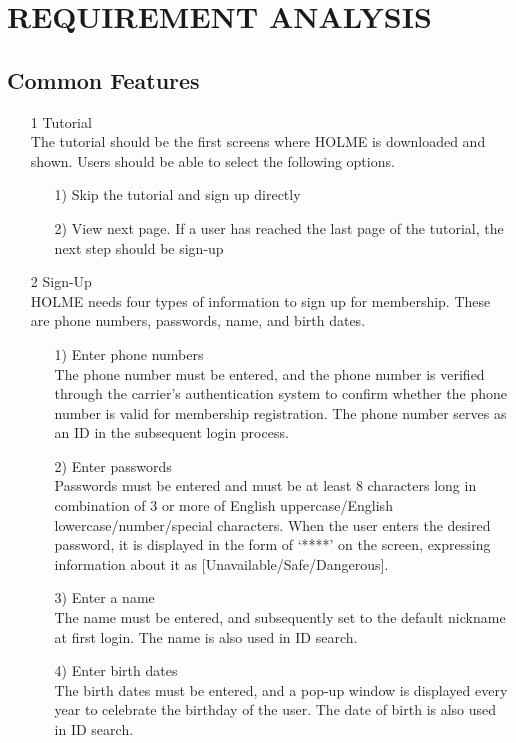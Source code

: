 \documentclass[conference]{IEEEtran}
\begin{document}
\section{REQUIREMENT ANALYSIS}

\subsection{Common Features}
\begin{enumerate}


\item[1] Tutorial \\ 
The tutorial should be the first screens where HOLME is downloaded and shown. Users should be able to select the following options. 
\begin{itemize}
\item [1)] Skip the tutorial and sign up directly
\item [2)] View next page. If a user has reached the last page of the tutorial, the next step should be sign-up\\
\end{itemize}


\item[2] Sign-Up \\ 
HOLME needs four types of information to sign up for membership. These are phone numbers, passwords, name, and birth dates.
\begin{itemize}
\item [1)] Enter phone numbers\\
The phone number must be entered, and the phone number is verified through the carrier's authentication system to confirm whether the phone number is valid for membership registration. The phone number serves as an ID in the subsequent login process.
\item [2)] Enter passwords \\
Passwords must be entered and must be at least 8 characters long in combination of 3 or more of English uppercase/English lowercase/number/special characters. When the user enters the desired password, it is displayed in the form of ‘****’ on the screen, expressing information about it as [Unavailable/Safe/Dangerous].
\item [3)] Enter a name  \\
The name must be entered, and subsequently set to the default nickname at first login. The name is also used in ID search.
\item [4)] Enter birth dates \\
The birth dates must be entered, and a pop-up window is displayed every year to celebrate the birthday of the user. The date of birth is also used in ID search.\\
\end{itemize}



\end{enumerate}
\end{document}
